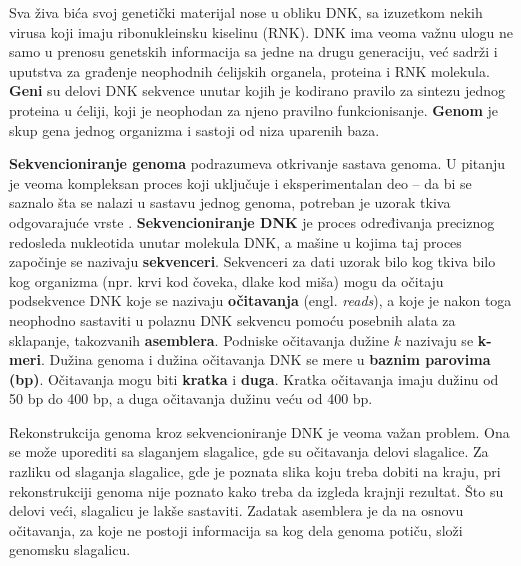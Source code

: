 \documentclass[12pt,oneside]{memoir}
\begin{document}
Sva živa bića svoj genetički materijal nose u obliku DNK, sa izuzetkom nekih virusa koji imaju ribonukleinsku kiselinu (RNK). DNK ima veoma važnu ulogu ne samo u prenosu genetskih informacija sa jedne na drugu generaciju, već sadrži i uputstva za građenje neophodnih ćelijskih organela, proteina i RNK molekula. \textbf{Geni} su delovi DNK sekvence unutar kojih je kodirano pravilo za sintezu jednog proteina u ćeliji, koji je neophodan za njeno pravilno funkcionisanje. \textbf{Genom} je skup gena jednog organizma i sastoji od niza uparenih baza. 

\textbf{Sekvencioniranje genoma} podrazumeva otkrivanje sastava genoma. U pitanju je veoma kompleksan proces koji uključuje i eksperimentalan deo – da bi se saznalo šta se nalazi u sastavu jednog genoma, potreban je uzorak tkiva
odgovarajuće vrste \cite{skriptaBio}. \textbf{Sekvencioniranje DNK} je proces određivanja preciznog redosleda nukleotida unutar molekula DNK, a mašine u kojima taj proces započinje se nazivaju \textbf{sekvenceri}. Sekvenceri za dati uzorak bilo kog tkiva bilo kog organizma (npr. krvi kod čoveka, dlake kod miša) mogu da očitaju podsekvence DNK koje se nazivaju \textbf{očitavanja} (engl. \textit{reads}), a koje je nakon toga neophodno sastaviti u polaznu DNK sekvencu pomoću posebnih alata za sklapanje, takozvanih \textbf{asemblera}. Podniske očitavanja dužine $k$ nazivaju se \textbf{k-meri}. Dužina genoma i dužina očitavanja DNK se mere u \textbf{baznim parovima (bp)}. Očitavanja mogu biti  \textbf{kratka} i \textbf{duga}. Kratka očitavanja imaju dužinu od 50 bp do 400 bp, a duga očitavanja dužinu veću od 400 bp.

Rekonstrukcija genoma kroz sekvencioniranje DNK je veoma važan problem. Ona se može uporediti sa slaganjem slagalice, gde su očitavanja delovi slagalice. Za razliku od slaganja slagalice, gde je poznata slika koju treba dobiti na kraju, pri rekonstrukciji genoma nije poznato kako treba da izgleda krajnji rezultat. Što su delovi veći, slagalicu je lakše sastaviti. Zadatak asemblera je da na osnovu očitavanja, za koje ne postoji informacija sa kog dela genoma potiču, složi genomsku slagalicu.

\begin{comment}
Rekonstrukcija genoma kroz sekvencioniranje DNK je veoma važan problem u genomici. Postojeće biotehnologije ne mogu proći kroz ceo hromozom, jer je predugačak. Umesto toga, genom se rekonstruiše indirektno. Prvo, vrši se razbijanje genoma na DNK fragmente koristeći pristup očitavanja celog sekvencioniranog genoma (engl. \textit{whole genome shotgun approach}). Zatim se pomoću mašine za sekvencioniranje na osnovu fragmenata vrši dekodiranje DNK sekvence. Ove DNK sekvence se nazivaju \textbf{očitavanja (engl. \textit{reads})}. Usled slučajnog uzorkovanja , ekstahovana očitavanja pokrivaju ceo genom ravnomerno. Lepljenjem ovih očitavanja možemo računski rekonstruisati genom. Ovaj proces je poznat kao \textbf{genomsko sekvencioniranje \textit{de novo}}.
\end{comment}
\end{document}
